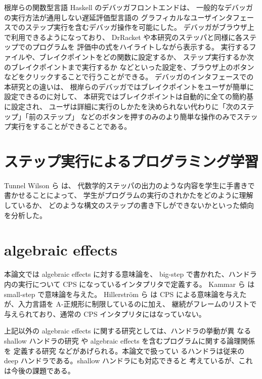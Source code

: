 根岸ら\cite{NI2009}の関数型言語 Haskell のデバッガフロントエンドは、
一般的なデバッガの実行方法が通用しない遅延評価型言語の
グラフィカルなユーザインタフェースでのステップ実行を含むデバッガ操作を可能にした。
デバッガがブラウザ上で利用できるようになっており、
DrRacket や本研究のステッパと同様に各ステップでのプログラムを
評価中の式をハイライトしながら表示する。
実行するファイルや、ブレイクポイントをどの関数に設定するか、
ステップ実行するか次のブレイクポイントまで実行するか
などといった設定を、ブラウザ上のボタンなどをクリックすることで行うことができる。
デバッガのインタフェースでの本研究との違いは、
根岸ら\cite{NI2009}のデバッガではブレイクポイントをユーザが簡単に設定できるのに対して、
本研究ではブレイクポイントは自動的に全ての簡約基に設定され、
ユーザは詳細に実行のしかたを決められない代わりに「次のステップ」「前のステップ」
などのボタンを押すのみのより簡単な操作のみでステップ実行をすることができることである。

\section{ステップ実行によるプログラミング学習}

Tunnel Wilson ら \cite{tunnell18} は、
代数学的ステッパの出力のような内容を学生に手書きで書かせることによって、
学生がプログラムの実行のされかたをどのように理解しているか、
どのような構文のステップの書き下しができないかといった傾向を分析した。

\section{algebraic effects}
\label{section:algebraic effects__related}

本論文では algebraic effects に対する意味論を、
big-step で書かれた、ハンドラ内の実行について CPS になっているインタプリタで定義する。
Kammar ら \cite{10.1145/2500365.2500590} は small-step で意味論を与えた。
Hillerstr{\"o}m ら \cite{e6cb0c3222794e48bf38cf44e46fe4aa} は
CPS による意味論を与えたが、入力言語を A-正規形に制限しているのに加え、
継続がフレームのリストで与えられており、通常の CPS インタプリタにはなっていない。

上記以外の algebraic effects に関する研究としては、ハンドラの挙動が異
なる shallow ハンドラの研究 \cite{10.1007/978-3-030-02768-1_22} や
algebraic effects を含むプログラムに関する論理関係を
定義する研究 \cite{10.1145/3158096} などがあげられる。本論文で扱ってい
るハンドラは従来の deep ハンドラである。shallow ハンドラにも対応できると
考えているが、これは今後の課題である。
